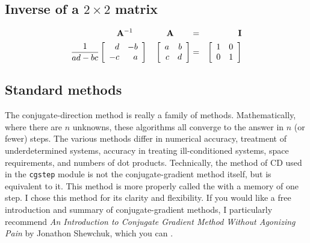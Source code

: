 \subsection{Inverse of a $2\times 2$ matrix}

\begin{eqnarray}
\bold A ^{-1} \quad\quad\quad\quad \bold A \quad\quad &=& \ \quad\bold I
\\
\label{eqn:twobytwoinv}
\frac{1}{ad-bc}
\left[
\begin{array}{rr}
d & -b  \\
-c & a
\end{array}
\right]
\quad
\left[
\begin{array}{rr}
a & b  \\
c & d
\end{array}
\right]
&=&
\left[
\begin{array}{rr}
1 & 0  \\
0 & 1
\end{array}
\right]
\end{eqnarray}




\subsection{Standard methods}
The conjugate-direction method is really a family of methods.
Mathematically, where there are $n$ unknowns, these algorithms all
converge to the answer in $n$ (or fewer) steps.  The various methods
differ in numerical accuracy, treatment of underdetermined systems,
accuracy in treating ill-conditioned systems, space requirements, and
numbers of dot products.  Technically, the method of CD used in the
\texttt{cgstep} module  is not the
conjugate-gradient method itself, but is equivalent to it.  This
method is more properly called the 
with a memory of one step.  I chose this method for its clarity and
flexibility.  If you would like a free introduction and summary of
conjugate-gradient methods, I particularly recommend {\it An
  Introduction to Conjugate Gradient Method Without Agonizing Pain }
by Jonathon Shewchuk, which you can .

